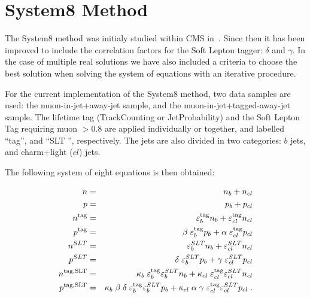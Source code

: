 \section{System8 Method}
\label{sec:system8}

The System8 method was initialy studied within CMS in~\cite{ref:btag_oldnote}. 
Since then it has been 
improved to include the correlation factors for the Soft Lepton tagger:
 $\delta $ and $\gamma$. In the case of multiple real solutions we have also 
included a criteria to choose the best solution 
when solving the system of equations with an iterative procedure.
 
For the current implementation of the System8 method, 
two data samples are used: the muon-in-jet+away-jet sample, and the 
muon-in-jet+tagged-away-jet sample. The lifetime tag (TrackCounting or 
JetProbability) and the Soft Lepton Tag requiring muon  \ptrel $ > 0.8 $\gevc 
are applied individually or together, and labelled ``tag'', and ``SLT '',
 respectively. The jets are also divided in two categories: 
$b$ jets, and charm+light ($cl$) jets. 

The following system of eight equations is then obtained:

\begin{eqnarray}
n &=& n_b + n_{cl} \nonumber\\
p &=& p_b+ p_{cl} \nonumber\\
n^{\rm{tag}} &=&
\varepsilon_b^{\rm{tag}} n_b + \varepsilon_{cl}^{\rm{tag}} n_{cl} \nonumber\\
p^{\rm{tag}} &=&
\beta \; \varepsilon_b^{\rm{tag}} p_b + \alpha \; \varepsilon_{cl}^{\rm{tag}} p_{cl} \\
n^{SLT} &=&
\varepsilon_b^{SLT} n_b + \varepsilon_{cl}^{SLT} n_{cl} \nonumber \\
p^{SLT} &=& \delta \; \varepsilon_b^{SLT} p_b + \gamma \; \varepsilon_{cl}^{SLT} p_{cl} \nonumber\\
n^{\rm{tag},SLT} &=&
\kappa_b \; \varepsilon_b^{\rm{tag}} \varepsilon_b^{SLT} n_b +
\kappa_{cl} \; \varepsilon_{cl}^{\rm{tag}} \varepsilon_{cl}^{SLT} n_{cl} \nonumber\\
p^{\rm{tag},SLT} &=&
\kappa_b \; \beta \; \delta \; \varepsilon_b^{\rm{tag}} \varepsilon_b^{SLT} p_b +
\kappa_{cl} \; \alpha \; \gamma \; \varepsilon_{cl}^{\rm{tag}} \varepsilon_{cl}^{SLT} p_{cl} \;.\nonumber
\end{eqnarray}

